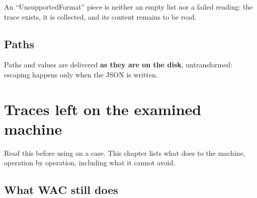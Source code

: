 \documentclass[11pt,a4paper,oneside]{report}
\begin{document}
\begin{attention}
An ``UnsupportedFormat'' piece is neither an empty list nor a failed reading:
the trace exists, it is collected, and its content remains to be read.
\end{attention}

\section{Paths}

Paths and values are delivered \textbf{as they are on the disk}, untransformed:
escaping happens only when the JSON is written.

\chapter{Traces left on the examined machine}\label{chap:traces}

Read this before using \wac{} on a case. This chapter lists what \wac{} does to
the machine, operation by operation, including what it cannot avoid.

\section{What WAC still does}
\end{document}
